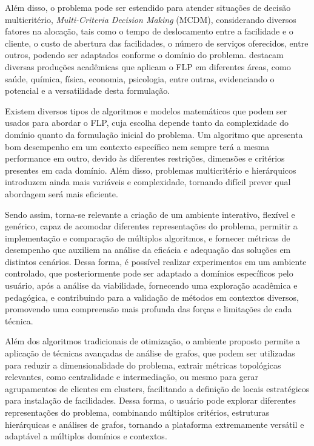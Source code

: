 Além disso, o problema pode ser estendido para atender situações de decisão multicritério, \textit{Multi-Criteria Decision Making} (MCDM), considerando diversos fatores na alocação, tais como o tempo de deslocamento entre a facilidade e o cliente, o custo de abertura das facilidades, o número de serviços oferecidos, entre outros, podendo ser adaptados conforme o domínio do problema.  destacam diversas produções acadêmicas que aplicam o FLP em diferentes áreas, como saúde, química, física, economia, psicologia, entre outras, evidenciando o potencial e a versatilidade desta formulação.


Existem diversos tipos de algoritmos e modelos matemáticos que podem ser usados para abordar o FLP, cuja escolha depende tanto da complexidade do domínio quanto da formulação inicial do problema. Um algoritmo que apresenta bom desempenho em um contexto específico nem sempre terá a mesma performance em outro, devido às diferentes restrições, dimensões e critérios presentes em cada domínio. Além disso, problemas multicritério e hierárquicos introduzem ainda mais variáveis e complexidade, tornando difícil prever qual abordagem será mais eficiente.

Sendo assim, torna-se relevante a criação de um ambiente interativo, flexível e genérico, capaz de acomodar diferentes representações do problema, permitir a implementação e comparação de múltiplos algoritmos, e fornecer métricas de desempenho que auxiliem na análise da eficácia e adequação das soluções em distintos cenários. Dessa forma, é possível realizar experimentos em um ambiente controlado, que posteriormente pode ser adaptado a domínios específicos pelo usuário, após a análise da viabilidade, fornecendo uma exploração acadêmica e pedagógica, e contribuindo para a validação de métodos em contextos diversos, promovendo uma compreensão mais profunda das forças e limitações de cada técnica.

Além dos algoritmos tradicionais de otimização, o ambiente proposto permite a aplicação de técnicas avançadas de análise de grafos, que podem ser utilizadas para reduzir a dimensionalidade do problema, extrair métricas topológicas relevantes, como centralidade e intermediação, ou mesmo para gerar agrupamentos de clientes em clusters, facilitando a definição de locais estratégicos para instalação de facilidades. Dessa forma, o usuário pode explorar diferentes representações do problema, combinando múltiplos critérios, estruturas hierárquicas e análises de grafos, tornando a plataforma extremamente versátil e adaptável a múltiplos domínios e contextos.

